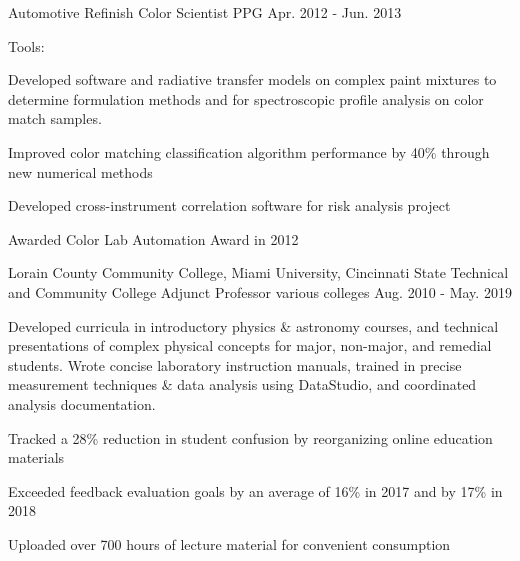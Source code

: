 \begin{cventries}
  \cvexpentry
    {Automotive Refinish} %
    {Color Scientist} %
    {PPG} %
    {Apr. 2012 - Jun. 2013}
    {
      \begin{cvheavyparagraph}
        Tools:
      \end{cvheavyparagraph}
    }
    {
      \begin{cvparagraph}
        Developed software and radiative transfer models on complex paint mixtures to determine formulation methods and for spectroscopic profile analysis on color match samples.
      \end{cvparagraph}
      \begin{cvitems} %
        \item {Improved color matching classification algorithm performance by 40\% through new numerical methods}
        \item {Developed cross-instrument correlation software for risk analysis project}
        \item {Awarded Color Lab Automation Award in 2012}
      \end{cvitems}
    }

  \cventry
    {Lorain County Community College, Miami University, Cincinnati State Technical and Community College} %
    {Adjunct Professor} %
    {various colleges} %
    {Aug. 2010 - May. 2019} %
    {
      \begin{cvparagraph}
        Developed curricula in introductory physics \& astronomy courses, and technical presentations of complex physical concepts for major, non-major, and remedial students.  Wrote concise laboratory instruction manuals, trained in precise measurement techniques \& data analysis using DataStudio, and coordinated analysis documentation.
      \end{cvparagraph}
      \begin{cvitems} %
        \item {Tracked a 28\% reduction in student confusion by reorganizing online education materials}
        \item {Exceeded feedback evaluation goals by an average of 16\% in 2017 and by 17\% in 2018}
        \item {Uploaded over 700 hours of lecture material for convenient consumption}
      \end{cvitems}
    }


\end{cventries}
